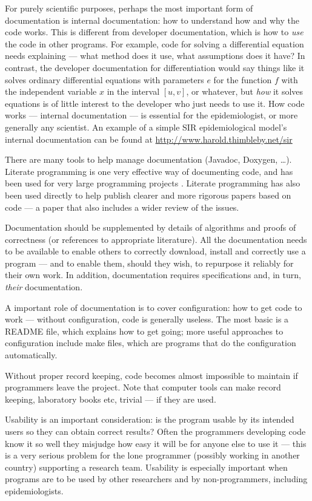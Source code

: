 \documentclass[10pt,a4paper]{article}
\begin{document}
For purely scientific purposes, perhaps the most important form of documentation is internal documentation: how to understand how and why the code works. This is different from developer documentation, which is how to \emph{use\/} the code in other programs. For example, code for solving a differential equation needs explaining --- what method does it use, what assumptions does it have? In contrast, the developer documentation for differentiation would say things like it solves ordinary differential equations with parameters $e$ for the function $f$ with the independent variable $x$ in the interval $[u,v]$, or whatever, but \emph{how\/} it solves equations is of little interest to the developer who just needs to use it. How code works --- internal documentation --- is essential for the epidemiologist, or more generally any scientist. An example of a simple SIR epidemiological model's internal documentation can be found at \url{http://www.harold.thimbleby.net/sir} 

There are many tools to help manage documentation (Javadoc, Doxygen, \ldots). Literate programming is one very effective way of documenting code, and has been used for very large programming projects \cite{LP}. Literate programming has also been used directly to help publish clearer and more rigorous papers based on code \cite{relit} --- a paper that also includes a wider review of the issues.

Documentation should be supplemented by details of algorithms and proofs of correctness (or references to appropriate literature). All the documentation needs to be available to enable others to correctly download, install and correctly use a program --- and to enable them, should they wish, to repurpose it reliably for their own work. In addition, documentation requires specifications and, in turn, \emph{their\/} documentation. 

A important role of documentation is to cover configuration: how to get code to work --- without configuration, code is generally useless. The most basic is a README file, which explains how to get going; more useful approaches to configuration include make files, which are programs that do the configuration automatically.

Without proper record keeping, code becomes almost impossible to maintain if programmers leave the project. Note that computer tools can make record keeping, laboratory books etc, trivial --- if they are used.

Usability is an important consideration: \cite{hci1,hci2} is the program usable by its intended users so they can obtain correct results? Often the programmers developing code know it so well they misjudge how easy it will be for anyone else to use it --- this is a very serious problem for the lone programmer (possibly working in another country) supporting a research team. Usability is especially important when programs are to be used by other researchers and by non-programmers, including epidemiologists.
\end{document}
